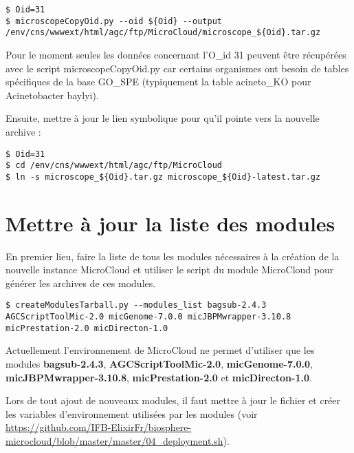 \begin{lstlisting}[style=bash]
$ Oid=31
$ microscopeCopyOid.py --oid ${Oid} --output /env/cns/wwwext/html/agc/ftp/MicroCloud/microscope_${Oid}.tar.gz
\end{lstlisting}

\begin{mycolorbox}
    Pour le moment seules les données concernant l'O\_id 31 peuvent être récupérées avec le script microscopeCopyOid.py car certains organismes ont besoin de tables spécifiques de la base GO\_SPE (typiquement la table acineto\_KO pour Acinetobacter baylyi).
\end{mycolorbox}

Ensuite, mettre à jour le lien symbolique pour qu'il pointe vers la nouvelle archive :
\begin{lstlisting}[style=bash]
$ Oid=31
$ cd /env/cns/wwwext/html/agc/ftp/MicroCloud
$ ln -s microscope_${Oid}.tar.gz microscope_${Oid}-latest.tar.gz
\end{lstlisting}

\section{Mettre à jour la liste des modules}

En premier lieu, faire la liste de tous les modules nécessaires à la création de la nouvelle instance MicroCloud et utiliser le script  du module MicroCloud pour générer les archives de ces modules.

\begin{lstlisting}[style=bash]
$ createModulesTarball.py --modules_list bagsub-2.4.3 AGCScriptToolMic-2.0 micGenome-7.0.0 micJBPMwrapper-3.10.8 micPrestation-2.0 micDirecton-1.0
\end{lstlisting}

Actuellement l'environnement de MicroCloud ne permet d'utiliser que les modules \textbf{bagsub-2.4.3}, \textbf{AGCScriptToolMic-2.0}, \textbf{micGenome-7.0.0}, \textbf{micJBPMwrapper-3.10.8}, \textbf{micPrestation-2.0} et \textbf{micDirecton-1.0}.
\newline

\begin{mycolorbox}
    Lors de tout ajout de nouveaux modules, il faut mettre à jour le fichier  et créer les variables d'environnement utilisées par les modules (voir \url{https://github.com/IFB-ElixirFr/biosphere-microcloud/blob/master/master/04_deployment.sh}).
\end{mycolorbox}

